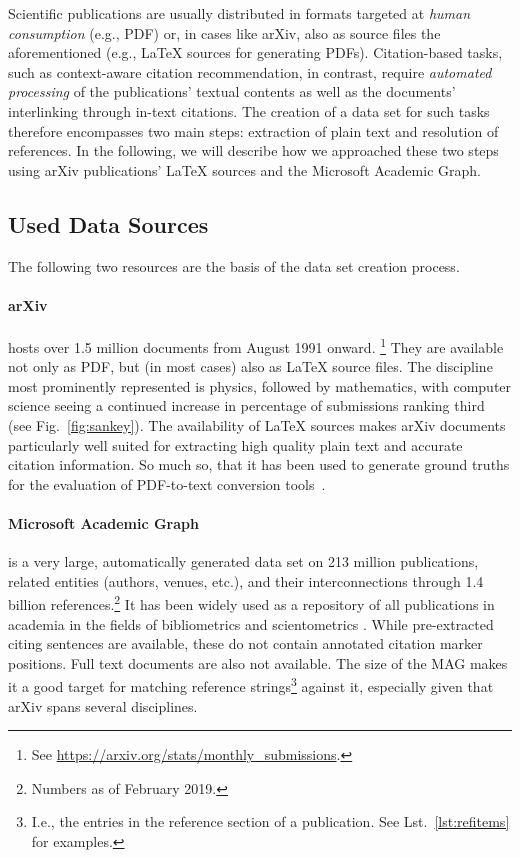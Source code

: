 Scientific publications are usually distributed in formats targeted at \emph{human consumption} (e.g., PDF) or, in cases like arXiv, also as source files the aforementioned (e.g., \LaTeX{} sources for generating PDFs). Citation-based tasks, such as context-aware citation recommendation, in contrast, require \emph{automated processing} of the publications' textual contents as well as the documents' interlinking through in-text citations. The creation of a data set for such tasks therefore encompasses two main steps: extraction of plain text and resolution of references. In the following, we will describe how we approached these two steps using arXiv publications' \LaTeX{} sources and the Microsoft Academic Graph.

\subsection{Used Data Sources}
The following two resources are the basis of the data set creation process.

\paragraph{arXiv} hosts over 1.5 million documents from August 1991 onward.%
\footnote{See \url{https://arxiv.org/stats/monthly\_submissions}.} They are available not only as PDF, but (in most cases) also as \LaTeX{} source files. The discipline most prominently represented is physics, followed by mathematics, with computer science seeing a continued increase in percentage of submissions ranking third (see Fig.~\ref{fig:sankey}). The availability of \LaTeX{} sources makes arXiv documents particularly well suited for extracting high quality plain text and accurate citation information. So much so, that it has been used to generate ground truths for the evaluation of PDF-to-text conversion tools~\cite{Bast2017}.
\paragraph{Microsoft Academic Graph} is a very large, automatically generated data set on 213 million publications, related entities (authors, venues, etc.), and their interconnections through 1.4 billion references.\footnote{Numbers as of February 2019.} It has been widely used as a repository of all publications in academia in the fields of bibliometrics and scientometrics \cite{Mohapatra2019}. While pre-extracted citing sentences are available, these do not contain annotated citation marker positions. Full text documents are also not available. The size of the MAG makes it a good target for matching reference strings\footnote{I.e., the entries in the reference section of a publication. See Lst.~\ref{lst:refitems} for examples.} against it, especially given that arXiv spans several disciplines.

